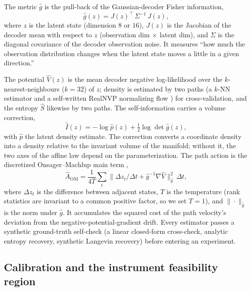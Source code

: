 \documentclass{article}
\begin{document}
The metric $\hat g$ is the pull-back of the Gaussian-decoder Fisher information,
\begin{equation}
\hat g(z) = J(z)^{\top}\,\Sigma^{-1}\,J(z),
\end{equation}
where $z$ is the latent state (dimension $8$ or $16$), $J(z)$ is the Jacobian of
the decoder mean with respect to $z$ (observation dim $\times$ latent dim), and
$\Sigma$ is the diagonal covariance of the decoder observation noise. It measures
``how much the observation distribution changes when the latent state moves a
little in a given direction.''

The potential $\hat V(z)$ is the mean decoder negative log-likelihood over the
$k$-nearest-neighbours ($k=32$) of $z$; density is estimated by two paths (a
$k$-NN estimator \citep{kozachenko1987knn} and a self-written RealNVP
normalizing flow \citep{dinh2017realnvp}) for cross-validation, and the entropy
$\hat S$ likewise by two paths. The self-information carries a volume correction,
\begin{equation}
\hat I(z) = -\log\hat p(z) + \tfrac12\log\det\hat g(z),
\end{equation}
with $\hat p$ the latent density estimate. The correction converts a coordinate
density into a density relative to the invariant volume of the manifold; without
it, the two axes of the affine law depend on the parameterization. The path
action is the discretized Onsager--Machlup main term
\citep{onsager1953om},
\begin{equation}
\hat A_{\mathrm{OM}} = \frac{1}{4T}\sum_t
\big\| \Delta z_t/\Delta t + \hat g^{-1}\nabla\hat V \big\|^2_{\hat g}\,\Delta t,
\end{equation}
where $\Delta z_t$ is the difference between adjacent states, $T$ is the
temperature (rank statistics are invariant to a common positive factor, so we set
$T=1$), and $\|\cdot\|_{\hat g}$ is the norm under $\hat g$. It accumulates the
squared cost of the path velocity's deviation from the negative-potential-gradient
drift. Every estimator passes a synthetic ground-truth self-check (a linear
closed-form cross-check, analytic entropy recovery, synthetic Langevin recovery)
before entering an experiment.

\subsection{Calibration and the instrument feasibility region}
\label{sec:calib}
\end{document}
